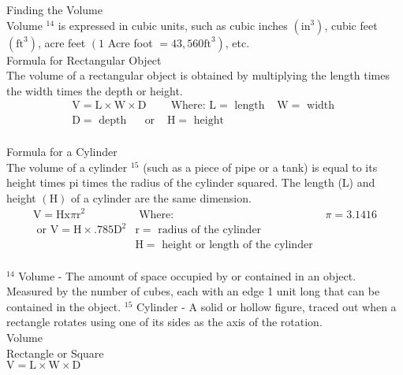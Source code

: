 Finding the Volume\\


Volume ${ }^{14}$ is expressed in cubic units, such as cubic inches $\left(\mathrm{in}^{3}\right)$, cubic feet $\left(\mathrm{ft}^{3}\right)$, acre feet $\left(1\right.$ Acre foot $\left.=43,560 \mathrm{ft}^{3}\right)$, etc.\\

Formula for Rectangular Object\\

The volume of a rectangular object is obtained by multiplying the length times the width times the depth or height.\\
$$
\begin{array}{lll}
\mathrm{V}=\mathrm{L} \times \mathrm{W} \times \mathrm{D} & \text { Where: } \mathrm{L}=\text { length } & \mathrm{W}=\text { width } \\
\mathrm{D}=\text { depth } \quad \text { or } & \mathrm{H}=\text { height }
\end{array}
$$\\
Formula for a Cylinder\\

The volume of a cylinder ${ }^{15}$ (such as a piece of pipe or a tank) is equal to its height times pi times the radius of the cylinder squared. The length (L) and height $(\mathrm{H})$ of a cylinder are the same dimension.\\
$$
\begin{array}{lll}
\mathrm{V}=\mathrm{Hx} \pi \mathrm{r}^{2} & \text { Where: } & \pi=3.1416 \\
\text { or } \mathrm{V}=\mathrm{H} \times .785 \mathrm{D}^{2} & \mathrm{r}=\text { radius of the cylinder } \\
& \mathrm{H}=\text { height or length of the cylinder }
\end{array}
$$\\
${ }^{14}$ Volume - The amount of space occupied by or contained in an object. Measured by the number of cubes, each with an edge 1 unit long that can be contained in the object. ${ }^{15}$ Cylinder - A solid or hollow figure, traced out when a rectangle rotates using one of its sides as the axis of the rotation.\\

Volume\\
Rectangle or Square\\

$\mathrm{V}=\mathrm{L} \times \mathrm{W} \times \mathrm{D}$\\

